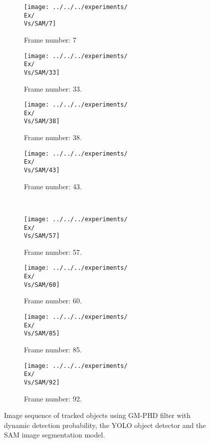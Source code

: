 \begin{figure}[H]
    \centering
    \begin{subfigure}{0.23\textwidth}
        \centering
        \texttt{[image: ../../../experiments/\\Ex/\\Vs/SAM/7]}
        \caption{Frame number: 7}
        \label{fig:\Ex-\Vs-\Set:01}
    \end{subfigure}
    \begin{subfigure}{0.23\textwidth}
        \centering
        \texttt{[image: ../../../experiments/\\Ex/\\Vs/SAM/33]}
        \caption{Frame number: 33.}
        \label{fig:\Ex-\Vs-\Set:02}
    \end{subfigure}
    \begin{subfigure}{0.23\textwidth}
        \centering
        \texttt{[image: ../../../experiments/\\Ex/\\Vs/SAM/38]}
        \caption{Frame number: 38.}
        \label{fig:\Ex-\Vs-\Set:03}
    \end{subfigure}
    \begin{subfigure}{0.23\textwidth}
        \centering
        \texttt{[image: ../../../experiments/\\Ex/\\Vs/SAM/43]}
        \caption{Frame number: 43.}
        \label{fig:\Ex-\Vs-\Set:04}
    \end{subfigure}
    \\
    \begin{subfigure}{0.23\textwidth}
        \centering
        \texttt{[image: ../../../experiments/\\Ex/\\Vs/SAM/57]}
        \caption{Frame number: 57.}
        \label{fig:\Ex-\Vs-\Set:05}
    \end{subfigure}
    \begin{subfigure}{0.23\textwidth}
        \centering
        \texttt{[image: ../../../experiments/\\Ex/\\Vs/SAM/60]}
        \caption{Frame number: 60.}
        \label{fig:\Ex-\Vs-\Set:06}
    \end{subfigure}
    \begin{subfigure}{0.23\textwidth}
        \centering
        \texttt{[image: ../../../experiments/\\Ex/\\Vs/SAM/85]}
        \caption{Frame number: 85.}
        \label{fig:\Ex-\Vs-\Set:07}
    \end{subfigure}
    \begin{subfigure}{0.23\textwidth}
        \centering
        \texttt{[image: ../../../experiments/\\Ex/\\Vs/SAM/92]}
        \caption{Frame number: 92.}
        \label{fig:\Ex-\Vs-\Set:08}
    \end{subfigure}
    \caption{Image sequence of tracked objects using GM-PHD filter with dynamic detection probability, the YOLO object detector and the SAM image segmentation model.}
    \label{fig:\Ex-\Vs-\Set}
\end{figure}


